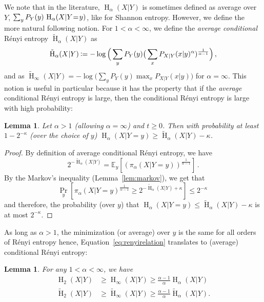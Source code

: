 \documentclass[final,11pt,a4paper]{report}
\newtheorem{lemma}[theorem]{Lemma}
\newcommand*{\assign}{\ensuremath{\kern.5ex\raisebox{.1ex}{\mbox{\rm:}}\kern -.3em =}}
\def\={\hspace{-0.5ex}=\hspace{-0.4ex}}
\renewcommand*{\sp}{\kappa}      %
\renewcommand*{\H}{\operatorname{H}}   %
\newcommand*{\tH}{\tilde{\H}}         %
\newcommand*{\E}{\mathbb{E}}   %
\begin{document}
We note that in the literature, $\H_{\alpha}(X|Y)$ is sometimes
defined as average over $Y$, $\sum_y P_Y(y) \, \H_{\alpha}(X|Y\=y)$,
like for Shannon entropy.  However, we define the more natural
following notion. For $1 < \alpha < \infty$, we define the {\em
  average conditional} R{\'e}nyi entropy $\tH_{\alpha}(X|Y)$ as
$$
\tH_{\alpha}(X|Y) \assign - \log \Big( \sum_y P_Y(y) \big(\sum_x
P_{X|Y}(x|y)^{\alpha})^{\frac{1}{\alpha-1}} \Big) \, ,
$$
and as $\tH_{\infty}(X|Y) = -\log \big(\sum_y P_Y(y) \max_x
P_{X|Y}(x|y)\big)$ for $\alpha = \infty$. This notion is useful in
particular because it has the property that if the {\em average}
conditional R{\'e}nyi entropy is large, then the conditional R{\'e}nyi
entropy is large with high probability:
\begin{lemma}\label{lemma:average}
  Let $\alpha > 1$ (allowing $\alpha = \infty$) and $t \geq 0$. Then
  with probability at least $1 - 2^{-\sp}$ (over the choice of $y$)
  $\H_{\alpha}(X|Y=y) \geq \tH_{\alpha}(X|Y) - \sp$.
\end{lemma}
\begin{proof}
By definition of average conditional R\'enyi entropy, we have
\[ 2^{-\tH_{\alpha}(X|Y)} = \E_y\left[
  (\pi_{\alpha}(X|Y=y))^\frac{1}{\alpha-1} \right] \, .
\]
By the Markov's inequality (Lemma~\ref{lem:markov}), we get that 
\[ \Pr_y \left[ \pi_\alpha(X|Y=y)^{\frac{1}{\alpha-1}} \geq
  2^{-\tH_\alpha(X|Y) + \sp} \right] \leq 2^{-\kappa} \,
\]
and therefore, the probability (over $y$) that $\H_\alpha(X|Y=y)
\leq \tH_\alpha(X|Y) - \sp$ is at most $2^{-\sp}$.
\end{proof}

As long as $\alpha>1$, the minimization (or average) over $y$ is the
same for all orders of R\'enyi entropy hence,
Equation~\eqref{eq:renyirelation} translates to (average) conditional
R{\'e}nyi entropy:
\begin{lemma}\label{lemma:bounds}
  For any $1 < \alpha < \infty$, we have
\begin{align*}
\H_2(X|Y) &\geq \H_{\infty}(X|Y) \geq \frac{\alpha-1}{\alpha}
\H_{\alpha}(X|Y) \\
\tH_2(X|Y) &\geq \tH_{\infty}(X|Y) \geq \frac{\alpha-1}{\alpha}
\tH_{\alpha}(X|Y) .
\end{align*}
\end{lemma}
\end{document}
